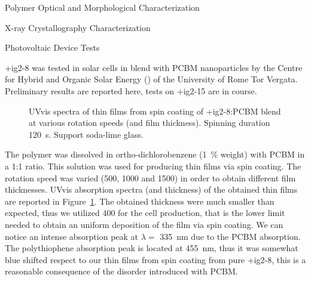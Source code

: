 \begin{section}{Polymer Optical and Morphological Characterization}
\begin{subsection}{X-ray Crystallography Characterization}
\end{subsection}
\clearpage
\begin{subsection}{Photovoltaic Device Tests}
\label{cella}

\cmpd+{ig2-8} was tested in solar cells in blend with \acrfull{PCBM} nanoparticles by the Centre for Hybrid and Organic Solar
Energy () of the University of Rome Tor Vergata. Preliminary results are reported here, tests on \cmpd+{ig2-15} are in course. 

\begin{figure}[tbp]%
 \caption[UV-vis spectra of thin films from spin coating of \cmpd+{ig2-8}:PCBM blend.]{\Gls{UVvis} spectra of thin films from spin coating of \cmpd+{ig2-8}:\gls{PCBM} blend at various rotation speeds (and film thickness). Spinning duration \SI{120}{\s}. Support soda-lime glass.}
\label{fig:ig2-11-pcbm-uvvis}
\end{figure}

The polymer was dissolved in ortho-di\-chloro\-benzene (1~\% weight) with \gls{PCBM} in a 1:1 ratio. 
This solution was used for producing thin films via spin coating. The rotation speed was varied (\SI{500}{\rpm}, \SI{1000}{\rpm} and \SI{1500}{\rpm}) in order to obtain different film thicknesses. 
\Gls{UVvis} absorption spectra (and thickness) of the obtained thin films are reported in Figure~\ref{fig:ig2-11-pcbm-uvvis}. The obtained thickness were much smaller than expected, thus we utilized \SI{400}{\rpm} for the cell production, that is the lower limit needed to obtain an uniform deposition of the film via spin coating. 
We can notice an intense absorption peak at $\lambda = $ \SI{335}{\nm} due to the \gls{PCBM} absorption. The polythio\-phene absorption peak is located at \SI{455}{\nm}, thus it was somewhat blue shifted respect to our thin films from spin coating from pure \cmpd+{ig2-8}, this is a reasonable consequence of the disorder introduced with \gls{PCBM}. 


\end{subsection}
\end{section}
